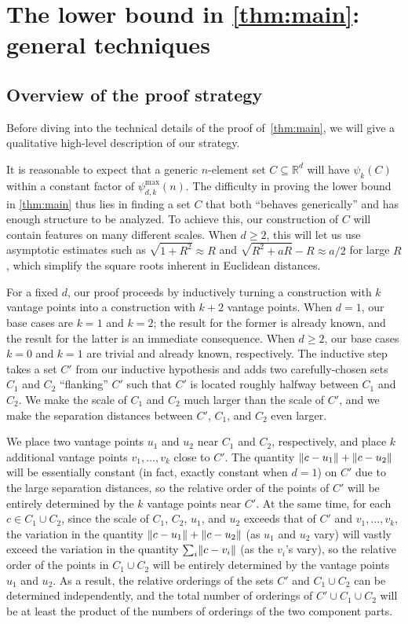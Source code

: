 \documentclass[11pt]{amsart}
\theoremstyle{definition}
\DeclarePairedDelimiter{\Abs}{\lVert}{\rVert}
\newcommand{\perm}{\psi^{\mathrm{max}}}
\newcommand{\RR}{\mathbb{R}}
\begin{document}
\section{The lower bound in \texorpdfstring{\cref{thm:main}}{Theorem \ref{thm:main}}: general techniques}\label{sec:lower}
\subsection{Overview of the proof strategy} \label{subsec:lowerintro}
Before diving into the technical details of the proof of~\cref{thm:main}, we will give a qualitative high-level description of our strategy.

It is reasonable to expect that a generic $n$-element set $C\subseteq \RR^d$ will have $\psi_{k}(C)$ within a constant factor of $\perm_{d,k}(n)$. The difficulty in proving the lower bound in \cref{thm:main} thus lies in finding a set $C$ that both ``behaves generically'' and has enough structure to be analyzed.  To achieve this, our construction of $C$ will contain features on many different scales.  When $d \geq 2$, this will let us use asymptotic estimates such as $\sqrt{1+R^2}\approx R$ and $\sqrt{R^2 + aR} - R \approx a/2$ for large $R$, which simplify the square roots inherent in Euclidean distances.

For a fixed $d$, our proof proceeds by inductively turning a construction with $k$ vantage points into a construction with $k+2$ vantage points.  When $d=1$, our base cases are $k=1$ and $k=2$; the result for the former is already known, and the result for the latter is an immediate consequence.  When $d \geq 2$, our base cases $k = 0$ and $k = 1$ are trivial and already known, respectively. The inductive step takes a set $C'$ from our inductive hypothesis and adds two carefully-chosen sets $C_1$ and $C_2$ ``flanking'' $C'$ such that $C'$ is located roughly halfway between $C_1$ and $C_2$. We make the scale of $C_1$ and $C_2$ much larger than the scale of $C'$, and we make the separation distances between $C'$, $C_1$, and $C_2$ even larger.

We place two vantage points $u_1$ and $u_2$ near $C_1$ and $C_2$, respectively, and place $k$ additional vantage points $v_1, \ldots, v_k$ close to $C'$.  The quantity $\Abs{c - u_1} + \Abs{c - u_2}$ will be essentially constant (in fact, exactly constant when $d=1$) on $C'$ due to the large separation distances, so the relative order of the points of $C'$ will be entirely determined by the $k$ vantage points near $C'$.  At the same time, for each $c\in C_1\cup C_2$, since the scale of $C_1$, $C_2$, $u_1$, and $u_2$ exceeds that of $C'$ and $v_1, \ldots, v_k$, the variation in the quantity $\Abs{c - u_1} + \Abs{c - u_2}$ (as $u_1$ and $u_2$ vary) will vastly exceed the variation in the quantity $\sum_i \Abs{c-v_i}$ (as the $v_i$'s vary), so the relative order of the points in $C_1 \cup C_2$ will be entirely determined by the vantage points $u_1$ and $u_2$. As a result, the relative orderings of the sets $C'$ and $C_1 \cup C_2$ can be determined independently, and the total number of orderings of $C' \cup C_1 \cup C_2$ will be at least the product of the numbers of orderings of the two component parts.
\end{document}
